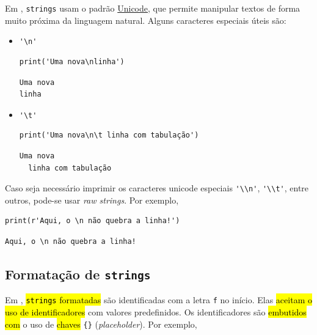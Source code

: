 Em {\python}, \texttt{strings} usam o padrão \href{https://home.unicode.org/}{Unicode}, que permite manipular textos de forma muito próxima da linguagem natural. Alguns caracteres especiais úteis são:
\begin{itemize}
\item \lstinline+'\n'+ 

\begin{lstlisting}[xrightmargin=2.5em]
print('Uma nova\nlinha')
\end{lstlisting}

\begin{verbatim}
Uma nova
linha  
\end{verbatim}

\item \lstinline+'\t'+ 

\begin{lstlisting}[xrightmargin=2.5em]
print('Uma nova\n\t linha com tabulação')
\end{lstlisting}

\begin{verbatim}
Uma nova
  linha com tabulação
\end{verbatim}
\end{itemize}

\begin{obs}
  Caso seja necessário imprimir os caracteres unicode especiais \lstinline+'\\n'+, \lstinline+'\\t'+, entre outros, pode-se usar \textit{raw strings}. Por exemplo,

\begin{lstlisting}
print(r'Aqui, o \n não quebra a linha!')
\end{lstlisting}

\begin{verbatim}
Aqui, o \n não quebra a linha!
\end{verbatim}

\end{obs}

\subsection{Formatação de \texttt{strings}}\label{cap_lingua_sec_string:subsec:format}

Em {\python}, \hl{\texttt{strings} formatadas} são identificadas com a letra \lstinline+f+ no início. Elas \hl{aceitam o uso de identificadores} com valores predefinidos. Os identificadores são \hl{embutidos com} o uso de \hl{chaves} \lstinline+{}+ (\textit{placeholder}). Por exemplo,


